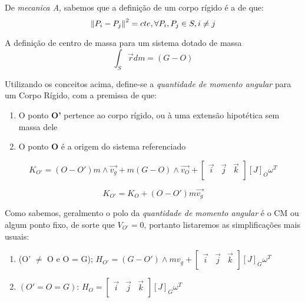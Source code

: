 \begin{namedtheorem}
De \textit{mecanica A}, sabemos que a definição de um corpo rígido é a de que:
$$ \norm{P_i - P_j}^2 = cte, \forall P_i, P_j \in  S, i \neq j$$
\end{namedtheorem}

\begin{namedtheorem}
A definição de centro de massa para um sistema dotado de massa
$$ \int_{S} \vec{r}dm = (G-O) $$
\end{namedtheorem}

Utilizando os conceitos acima, define-se a \textit{quantidade de momento angular} para um Corpo Rígido, com a premissa de que:

\begin{enumerate}
	\item O ponto \textbf{O'} pertence ao corpo rígido, ou à uma extensão hipotética sem massa dele
	\item O ponto \textbf{O} é a origem do sistema referenciado
\end{enumerate}

\begin{namedtheorem}
$$K_{O'} = (O-O')m\wedge\vec{v_g} + m(G-O)\wedge\vec{v_O} + \begin{bmatrix}\vec{i} & \vec{j} & \vec{k} \\ \end{bmatrix}[J]_O\omega^T $$
\end{namedtheorem}

\begin{namedtheorem}
$$K_{O'} = K_{O} + (O-O')m\vec{v_g} $$
\end{namedtheorem}

Como sabemos, geralmento o polo da \textit{quantidade de momento angular} é o CM ou algum ponto fixo, de sorte que $V_{O'} = 0$, portanto listaremos as simplificações mais usuais:

\begin{enumerate}
	\item (O' $\neq$ O e O = G); $H_{O'} = (G-O')\wedge mv_g + \begin{bmatrix}\vec{i} & \vec{j} & \vec{k} \\ \end{bmatrix}[J]_G\omega^T$
	\item $(O'=O=G)$: $H_{O} = \begin{bmatrix}\vec{i} & \vec{j} & \vec{k} \\ \end{bmatrix}[J]_G\omega^T$
\end{enumerate}

